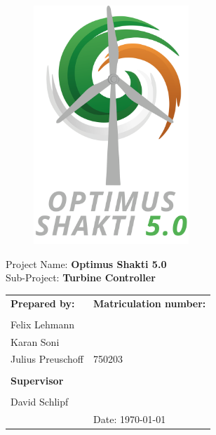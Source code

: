 {	\vspace{3cm}
	\begin{figure}[tbh]
		\centering
		\includegraphics[height=9cm]{Figures/logos/Shakti}
	\end{figure}
	
	\begin{minipage}[b][0cm][t]{\textwidth}
		\fontsize{20pt}{20pt}
		\selectfont
		Project Name: \textbf{Optimus Shakti 5.0}\\
		Sub-Project: \textbf{Turbine Controller}
	\end{minipage}
	\begin{minipage}[b][0cm][t]{\textwidth}
		\vspace{1.5cm}
		\fontsize{12pt}{14pt}
		\selectfont
		\begin{tabular}{l b{8cm}}
			\textbf{Prepared by:} & \textbf{Matriculation number:}\\
			\\
			Felix Lehmann & \\
			Karan Soni & \\
			Julius Preuschoff & 750203 \\
			\\
			\textbf{Supervisor} & \\
			\\
			David Schlipf & \\
			& Date: \today\\
		\end{tabular}
	\end{minipage}
}
